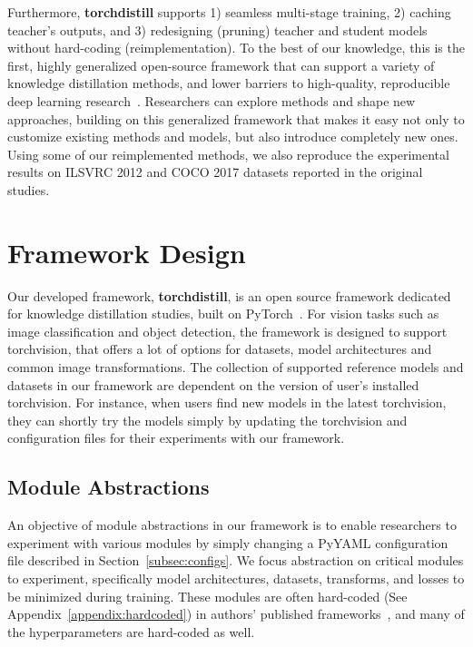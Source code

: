 \documentclass[runningheads]{llncs}
\newcommand{\FRAMEWORK}{{\bf torchdistill}\xspace}
\begin{document}
Furthermore, \FRAMEWORK supports 1) seamless multi-stage training, 2) caching teacher's outputs, and 3) redesigning (pruning) teacher and student models without hard-coding  (reimplementation).
To the best of our knowledge, this is the first, highly generalized open-source framework that can support a variety of knowledge distillation methods, and lower barriers to high-quality, reproducible deep learning research~\cite{gundersen2018state}.
Researchers can explore methods and shape new approaches, building on this generalized framework that makes it easy not only to customize existing methods and models, but also introduce completely new ones.
Using some of our reimplemented methods, we also reproduce the experimental results on ILSVRC 2012 and COCO 2017 datasets reported in the original studies.

\section{Framework Design}
\label{sec:design}
Our developed framework, \FRAMEWORK, is an open source framework dedicated for knowledge distillation studies, built on PyTorch~\cite{paszke2019pytorch}.
For vision tasks such as image classification and object detection, the framework is designed to support torchvision, that offers a lot of options for datasets, model architectures and common image transformations.
The collection of supported reference models and datasets in our framework are dependent on the version of user's installed torchvision.
For instance, when users find new models in the latest torchvision, they can shortly try the models simply by updating the torchvision and configuration files for their experiments with our framework.

\subsection{Module Abstractions}
\label{subsec:abstraction}

An objective of module abstractions in our framework is to enable researchers to experiment with various modules by simply changing a PyYAML configuration file described in Section~\ref{subsec:configs}.
We focus abstraction on critical modules to experiment, specifically model architectures, datasets, transforms, and losses to be minimized during training.
These modules are often hard-coded (See Appendix~\ref{appendix:hardcoded}) in authors' published frameworks~\cite{zagoruyko2017paying,passalis2018learning,heo2019knowledge,park2019relational,tian2020contrastive,xu2020knowledge}, and many of the hyperparameters are hard-coded as well.
\end{document}
